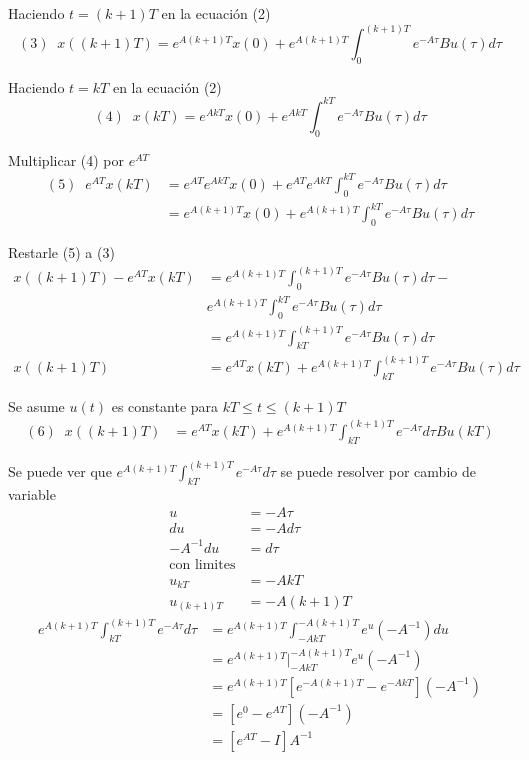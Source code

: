 Haciendo \( t = (k+1)T \) en la ecuación (2)
\[
    (3) \;\; x((k+1)T) = e^{ A(k+1)T }x(0) + e^{ A(k+1)T } \int_{0}^{ (k+1)T } e^{ -A\tau }Bu(\tau)d\tau
\]

Haciendo \( t = kT \) en la ecuación (2)
\[
    (4) \;\; x(kT) = e^{ AkT }x(0) + e^{ AkT }\int_{0}^{kT} e^{ -A\tau }Bu(\tau)d\tau
\]

Multiplicar (4) por \( e^{AT} \)
\[
    \begin{split}
        (5) \;\; e^{ AT }x(kT) & = e^{ AT }e^{AkT}x(0) + e^{ AT }e^{AkT}\int_{0}^{kT} e^{ -A\tau }Bu(\tau)d\tau \\
        & = e^{A(k+1)T}x(0) + e^{A(k+1)T}\int_{0}^{kT} e^{-A\tau}Bu(\tau)d\tau
    \end{split}
\]

Restarle (5) a (3)
\[
    \begin{split}
        x((k+1)T) - e^{AT}x(kT) & = e^{A(k+1)T} \int_{0}^{(k+1)T} e^{-A \tau}Bu(\tau)d\tau - \\ 
        & e^{A(k+1)T}\int_{0}^{kT}e^{-A \tau}Bu(\tau)d\tau \\
        & = e^{A(k+1)T}\int_{kT}^{(k+1)T}e^{-A \tau}Bu(\tau)d\tau \\
        x((k+1)T) & = e^{AT}x(kT) + e^{A(k+1)T}\int_{kT}^{(k+1)T}e^{-A \tau}Bu(\tau)d\tau 
    \end{split}
\]

Se asume \( u(t) \) es constante para \( kT \leq t \leq (k+1)T \)
\[
    \begin{split}
        (6) \;\; x((k+1)T) & = e^{AT}x(kT) + e^{A(k+1)T}\int_{kT}^{(k+1)T}e^{-A \tau}d\tau Bu(kT)  
    \end{split}
\]

Se puede ver que \( e^{A(k+1)T} \int_{kT}^{(k+1)T} e^{-A\tau} d\tau \) se puede resolver por cambio de variable 
\[
    \begin{split}
        u & = -A\tau \\
        du & = -Ad\tau \\
        -A^{-1}du & = d\tau \\
        \text{con limites} \\
        u_{kT} & = -AkT \\
        u_{(k+1)T} & = -A(k+1)T
    \end{split}
\]
\[
    \begin{split}
        e^{A(k+1)T} \int_{kT}^{(k+1)T} e^{-A\tau} d\tau & = e^{A(k+1)T} \int_{-AkT}^{-A(k+1)T} e^{u}(-A^{-1})du \\
        & = e^{A(k+1)T} \big|_{-AkT}^{-A(k+1)T} e^{u}(-A^{-1}) \\
        & = e^{A(k+1)T} [e^{-A(k+1)T} - e^{-AkT}] (-A^{-1}) \\
        & = [e^{0} - e^{AT}](-A^{-1}) \\
        & = [e^{AT} - I]A^{-1}
    \end{split}
\]

